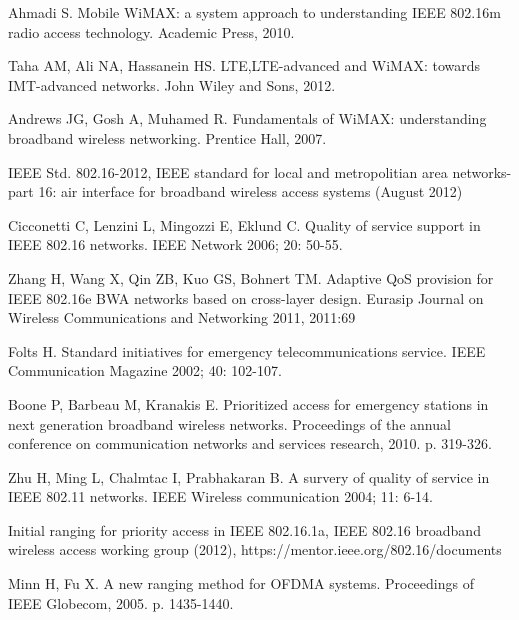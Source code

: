 \documentclass[preprint,12pt]{elsarticle}
\begin{document}
\begin{thebibliography}{}

Ahmadi S. Mobile WiMAX: a system approach to understanding IEEE 802.16m radio access technology. Academic Press, 2010.

Taha AM, Ali NA, Hassanein HS. LTE,LTE-advanced and WiMAX: towards IMT-advanced networks. John Wiley and Sons, 2012.

Andrews JG, Gosh A, Muhamed R. Fundamentals of WiMAX: understanding broadband wireless networking. Prentice Hall, 2007.

IEEE Std. 802.16-2012, IEEE standard for local and metropolitian area networks- part 16: air interface for broadband wireless access systems (August 2012)

Cicconetti C, Lenzini L, Mingozzi E, Eklund C. Quality of service support in IEEE 802.16 networks. IEEE Network 2006; 20: 50-55.

Zhang H, Wang X, Qin ZB, Kuo GS, Bohnert TM. Adaptive QoS provision for IEEE 802.16e BWA networks based on cross-layer design. Eurasip Journal on Wireless Communications and Networking 2011, 2011:69

Folts H. Standard initiatives for emergency telecommunications service. IEEE Communication Magazine 2002; 40: 102-107.

Boone P, Barbeau M, Kranakis E. Prioritized access for emergency stations in next generation broadband wireless networks. Proceedings of the annual conference on communication networks and services research, 2010. p. 319-326.

Zhu H, Ming L, Chalmtac I, Prabhakaran B. A survery of quality of service in IEEE 802.11 networks. IEEE Wireless communication 2004; 11: 6-14.

Initial ranging for priority access in IEEE 802.16.1a, IEEE 802.16 broadband wireless access working group (2012), https://mentor.ieee.org/802.16/documents

Minn H, Fu X. A new ranging method for OFDMA systems. Proceedings of IEEE Globecom, 2005. p. 1435-1440.

\end{thebibliography}
\end{document}
